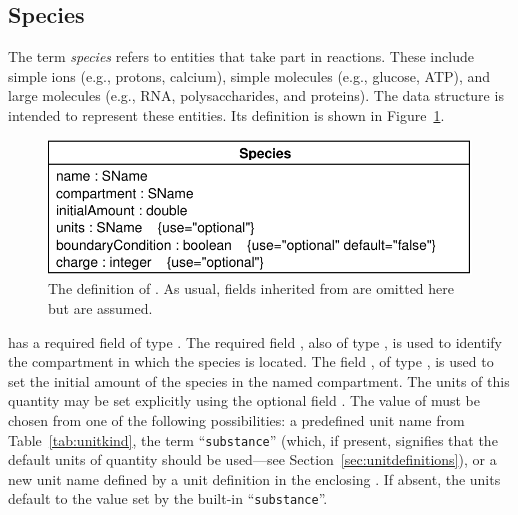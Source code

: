 \documentclass[10pt]{cekarticle}
\newcommand{\vref}[1]{\ref{#1}}
\newcommand{\changed}[1]{\textcolor{BrickRed}{#1}}
\begin{document}
\subsection{Species}
\label{sec:species}

The term \emph{species} refers to entities that take part in reactions.
These include simple ions (e.g., protons, calcium), simple molecules (e.g.,
glucose, ATP), and large molecules (e.g., RNA, polysaccharides, and
proteins).  The  data structure is intended to represent
these entities.  Its definition is shown in Figure~\vref{fig:species}.

\begin{figure}[htb]
  \centering
  \vspace*{5pt}
  \includegraphics[scale = 0.65]{figs/species}
  \caption{The definition of .  As usual, fields inherited from
     are omitted here but are assumed.}
  \label{fig:species}
\end{figure}

 has a required  field of type .
The required field , also of type , is
used to identify the compartment in which the species is located.  The field
, of type , is used to set the initial
amount of the species in the named compartment.  The units of \changed{this
  quantity may be set explicitly using the optional field \attrib{units}.
  The value of \attrib{units} must be chosen from one of the following
  possibilities: a predefined unit name from Table~\ref{tab:unitkind}, the
  term ``\texttt{substance}'' (which, if present, signifies that the
  default} \changed{units of quantity should be used---see
  Section~\ref{sec:unitdefinitions}), or a new unit name defined by a unit
  definition in the enclosing \class{Model}.  If absent, the units default
  to the value set by the built-in ``\texttt{substance}''.}
\end{document}
